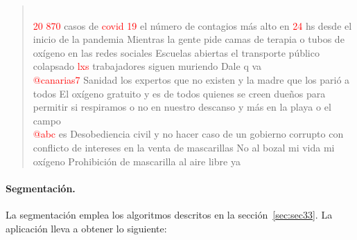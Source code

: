 \begin{quote}
	\vspace{12pt} \\
	\textcolor{red}{}\textcolor{red}{20} \textcolor{red}{870} casos de \textcolor{red}{covid} \textcolor{red}{19} el número de contagios más alto en \textcolor{red}{24} hs desde el inicio de la pandemia Mientras la gente pide camas de terapia o tubos de oxígeno en las redes sociales Escuelas abiertas el transporte público colapsado \textcolor{red}{lxs} trabajadores siguen muriendo Dale q va \textcolor{red}{} 
	\vspace{12pt} \\
	\textcolor{red}{} \textcolor{red}{@canarias7} Sanidad los expertos que no existen y la madre que los parió a todos El oxígeno gratuito y es de todos quienes se creen dueños para permitir si respiramos o no en nuestro descanso y más en la playa o el campo \textcolor{red}{} 
	\vspace{12pt} \\
	\textcolor{red}{}\textcolor{red}{@abc} es Desobediencia civil y no hacer caso de un gobierno corrupto con conflicto de intereses en la venta de mascarillas No al bozal mi vida mi oxígeno Prohibición de mascarilla al aire libre ya \textcolor{red}{} 
\end{quote}

\paragraph{Segmentación.} La segmentación emplea los algoritmos descritos en la sección~\ref{sec:sec33}. La aplicación lleva a obtener lo siguiente:

